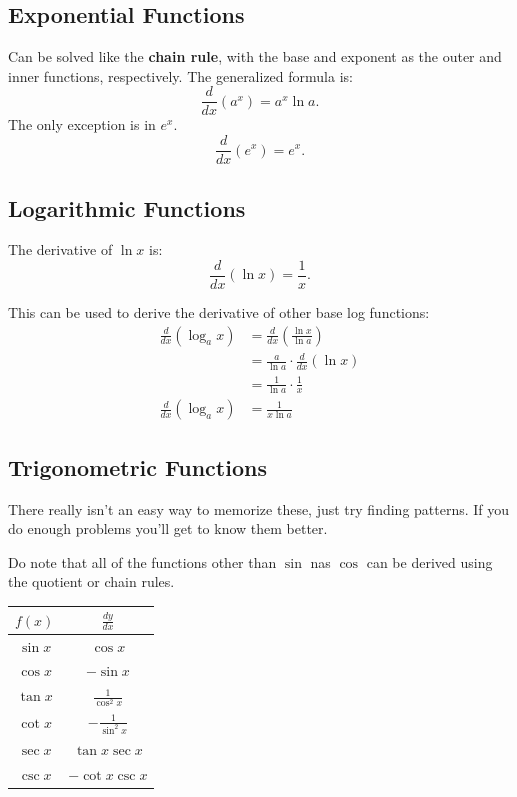 \documentclass[12pt]{article}
\begin{document}
        \subsection{Exponential Functions}
            Can be solved like the \textbf{chain rule}, with the base and exponent as the outer and inner functions, respectively. The generalized formula is:
            \[ \frac{d}{dx} \left( a^x \right) = a^x \ln{a}. \]
            The only exception is in $e^x$.
            \[ \frac{d}{dx} \left( e^x \right) = e^x.\]

        \subsection{Logarithmic Functions}
            \noindent The derivative of $\ln{x}$ is:
            \[ \frac{d}{dx} \left( \ln{x} \right) = \frac{1}{x}. \]

            \noindent This can be used to derive the derivative of other base log functions:
            \begin{align*}
                \frac{d}{dx} \left( \log_a{x} \right) &= \frac{d}{dx} \left( \frac{\ln{x}}{\ln{a}} \right) \\[6pt]
                &= \frac{a}{\ln{a}} \cdot \frac{d}{dx} \left( \ln{x} \right) \\[6pt]
                &= \frac{1}{\ln{a}} \cdot \frac{1}{x} \\[6pt]
                \frac{d}{dx} \left( \log_a{x} \right) &= \frac{1}{x \ln{a}}
            \end{align*}

        \subsection{Trigonometric Functions}
            There really isn't an easy way to memorize these, just try finding patterns. If you do enough problems you'll get to know them better.

            Do note that all of the functions other than $\sin$ nas $\cos$ can be derived using the quotient or chain rules.
            \begin{center}
                \begin{tabular}{|c|c|}
                    \hline
                    $f(x)$ & $\frac{dy}{dx}$ \\
                    \hline \hline
                    $\sin{x}$ & $\cos{x}$ \\
                    \hline
                    $\cos{x}$ & $-\sin{x}$ \\
                    \hline
                    $\tan{x}$ & $\frac{1}{\cos^2{x}}$ \\
                    \hline \hline
                    $\cot{x}$ & $-\frac{1}{\sin^2{x}}$ \\
                    \hline
                    $\sec{x}$ & $\tan{x} \sec{x}$ \\
                    \hline
                    $\csc{x}$ & $-\cot{x} \csc{x}$ \\
                    \hline
                \end{tabular}
            \end{center}
\end{document}
